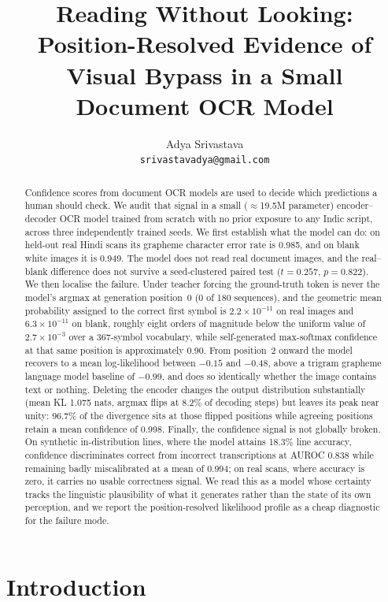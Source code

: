 \documentclass{article}
\title{Reading Without Looking: Position-Resolved Evidence of\\Visual Bypass in a Small Document OCR Model}
\author{%
  Adya Srivastava\\
  \texttt{srivastavadya@gmail.com}\\
}
\begin{document}
\maketitle

\begin{abstract}
Confidence scores from document OCR models are used to decide which predictions a human
should check. We audit that signal in a small ($\approx$19.5M parameter) encoder--decoder OCR
model trained from scratch with no prior exposure to any Indic script, across three
independently trained seeds. We first establish what the model can do: on held-out real Hindi
scans its grapheme character error rate is 0.985, and on blank white images it is 0.949. The
model does not read real document images, and the real--blank difference does not survive a
seed-clustered paired test ($t = 0.257$, $p = 0.822$). We then localise the
failure. Under teacher forcing the ground-truth token is never the model's argmax at
generation position~0 (0 of 180 sequences), and the geometric mean probability assigned to the
correct first symbol is $2.2\times10^{-11}$ on real images and $6.3\times10^{-11}$ on blank,
roughly eight orders of magnitude below the uniform value of $2.7\times10^{-3}$ over a
367-symbol vocabulary, while self-generated max-softmax confidence at that same position is
approximately 0.90. From position~2 onward the model recovers to a mean log-likelihood between
$-0.15$ and $-0.48$, above a trigram grapheme language model baseline of $-0.99$, and does so
identically whether the image contains text or nothing. Deleting the encoder changes the
output distribution substantially (mean KL 1.075 nats, argmax flips at 8.2\% of decoding
steps) but leaves its peak near unity: 96.7\% of the divergence sits at those flipped
positions while agreeing positions retain a mean confidence of 0.998. Finally, the confidence signal is not globally broken. On
synthetic in-distribution lines, where the model attains 18.3\% line accuracy, confidence
discriminates correct from incorrect transcriptions at AUROC 0.838 while remaining badly
miscalibrated at a mean of 0.994; on real scans, where accuracy is zero, it carries no usable
correctness signal. We read this as a model whose certainty tracks the linguistic plausibility
of what it generates rather than the state of its own perception, and we report the
position-resolved likelihood profile as a cheap diagnostic for the failure mode.
\end{abstract}

\section{Introduction}
\end{document}
